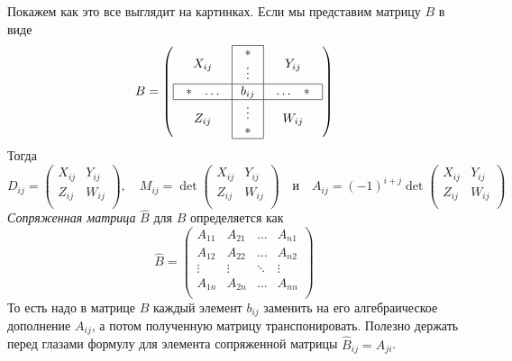 Покажем как это все выглядит на картинках.  Если мы представим матрицу $B$ в виде
\[
B =
\left(
\begin{array}{c|c|c}
\cline{2-2}
{X_{ij}}&{
\begin{array}{c}
{*}\\{\vdots}
\end{array}
}&{Y_{ij}}\\
\hline
\multicolumn{1}{|c|}{
\begin{array}{cc}
{*}&{\ldots}
\end{array}
}&{b_{ij}}&\multicolumn{1}{c|}{
\begin{array}{cc}
{\ldots}&{*}
\end{array}
}\\
\hline
{Z_{ij}}&{
\begin{array}{c}
{\vdots}\\{*}
\end{array}
}&{W_{ij}}\\
\cline{2-2}
\end{array}
\right)
\]
Тогда
\[
D_{ij} =
\begin{pmatrix}
{X_{ij}}&{Y_{ij}}\\
{Z_{ij}}&{W_{ij}}\\
\end{pmatrix},\quad
M_{ij} = 
\det
\begin{pmatrix}
{X_{ij}}&{Y_{ij}}\\
{Z_{ij}}&{W_{ij}}\\
\end{pmatrix}\quad\text{и}\quad
A_{ij} =
(-1)^{i+j}
\det
\begin{pmatrix}
{X_{ij}}&{Y_{ij}}\\
{Z_{ij}}&{W_{ij}}\\
\end{pmatrix}
\]
{\it Сопряженная матрица} $\hat B$ для $B$ определяется как
\[
\hat B = 
\begin{pmatrix}
{A_{11}}&{A_{21}}&{\ldots}&{A_{n1}}\\
{A_{12}}&{A_{22}}&{\ldots}&{A_{n2}}\\
{\vdots}&{\vdots}&{\ddots}&{\vdots}\\
{A_{1n}}&{A_{2n}}&{\ldots}&{A_{nn}}\\
\end{pmatrix}
\]
То есть надо в матрице $B$ каждый элемент $b_{ij}$ заменить на его алгебраическое дополнение $A_{ij}$, а потом полученную матрицу транспонировать. Полезно держать перед глазами формулу для элемента сопряженной матрицы $\hat B_{ij} = A_{ji}$.

